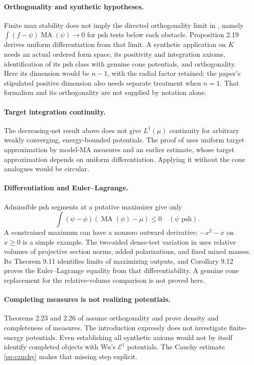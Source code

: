 \documentclass[11pt]{article}
\newcommand{\MA}{\operatorname{MA}}
\newcommand{\EE}{\mathcal E^1}
\theoremstyle{remark}
\begin{document}
\paragraph{Orthogonality and synthetic hypotheses.}
Finite max stability does not imply the directed orthogonality limit in \cite[Definition 2.15]{BJ23}, namely $\int(f-\psi)\MA(\psi)\to0$ for psh tests below each obstacle. Proposition 2.19 derives uniform differentiation from that limit. A synthetic application on $K$ needs an actual ordered form space, its positivity and integration axioms, identification of its psh class with genuine cone potentials, and orthogonality. Here its dimension would be $n-1$, with the radial factor retained; the paper's stipulated positive dimension also needs separate treatment when $n=1$. That formalism and its orthogonality are not supplied by notation alone.

\paragraph{Target integration continuity.}
The decreasing-net result above does not give $L^1(\mu)$ continuity for arbitrary weakly converging, energy-bounded potentials. The proof of \cite[Proposition 9.19]{BJ22} uses uniform target approximation by model-MA measures and an earlier estimate, whose target approximation depends on uniform differentiation. Applying it without the cone analogues would be circular.

\paragraph{Differentiation and Euler--Lagrange.}
Admissible psh segments at a putative maximizer give only
\[
 \int(\psi-\phi)(\MA(\phi)-\mu)\le0\quad(\psi\text{ psh}).
\]
A constrained maximum can have a nonzero outward derivative; $-x^2-x$ on $x\ge0$ is a simple example. The two-sided dense-test variation in \cite[Theorem 8.5]{BJ22} uses relative volumes of projective section norms, added polarizations, and fixed mixed masses. Its Theorem 9.11 identifies limits of maximizing outputs, and Corollary 9.12 proves the Euler--Lagrange equality from that differentiability. A genuine cone replacement for the relative-volume comparison is not proved here.

\paragraph{Completing measures is not realizing potentials.}
Theorems 2.23 and 2.26 of \cite{BJ23} assume orthogonality and prove density and completeness of measures. The introduction expressly does not investigate finite-energy potentials. Even establishing all synthetic axioms would not by itself identify completed objects with Wu's $\EE$ potentials. The Cauchy estimate \eqref{eq:cauchy} makes that missing step explicit.
\end{document}
